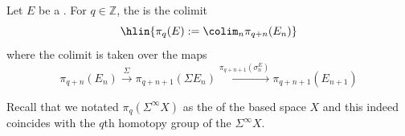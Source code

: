 \begin{definition} \label{definition:homotopy_group_of_a_spectrum}
    Let $E$ be a .
    For $q \in \mathbb{Z}$, the  is the colimit
    $$\hlin{\pi_q(E) := \colim_n \pi_{q+n}(E_n)}$$
    where the colimit is taken over the maps
    $$\pi_{q+n}(E_n) \xrightarrow{\Sigma} \pi_{q+n+1}(\Sigma E_n) \xrightarrow{\pi_{q+n+1}(\sigma_n^E)} \pi_{q+n+1}(E_{n+1})$$

    Recall that we notated $\pi_q(\Sigma^\infty X)$ as the  of the based space $X$ and this indeed coincides with the $q$th homotopy group of the  $\Sigma^\infty X$. 
\end{definition}